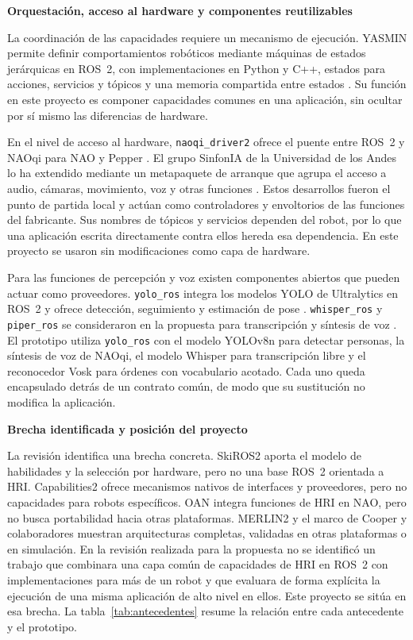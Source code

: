 \documentclass[11pt,letterpaper]{article}
\newcommand{\code}[1]{\nolinkurl{#1}}
\begin{document}
\par\medskip\noindent\textbf{Orquestación, acceso al hardware y componentes reutilizables}\par

La coordinación de las capacidades requiere un mecanismo de ejecución. YASMIN permite definir comportamientos robóticos mediante máquinas de estados jerárquicas en ROS~2, con implementaciones en Python y C++, estados para acciones, servicios y tópicos y una memoria compartida entre estados \cite{yasmin,yasminrepo}. Su función en este proyecto es componer capacidades comunes en una aplicación, sin ocultar por sí mismo las diferencias de hardware.

En el nivel de acceso al hardware, \code{naoqi_driver2} ofrece el puente entre ROS~2 y NAOqi para NAO y Pepper \cite{naoqidriver}. El grupo SinfonIA de la Universidad de los Andes lo ha extendido mediante un metapaquete de arranque que agrupa el acceso a audio, cámaras, movimiento, voz y otras funciones \cite{sinfonia}. Estos desarrollos fueron el punto de partida local y actúan como controladores y envoltorios de las funciones del fabricante. Sus nombres de tópicos y servicios dependen del robot, por lo que una aplicación escrita directamente contra ellos hereda esa dependencia. En este proyecto se usaron sin modificaciones como capa de hardware.

Para las funciones de percepción y voz existen componentes abiertos que pueden actuar como proveedores. \code{yolo_ros} integra los modelos YOLO de Ultralytics en ROS~2 y ofrece detección, seguimiento y estimación de pose \cite{yoloros,ultralytics}. \code{whisper_ros} y \code{piper_ros} se consideraron en la propuesta para transcripción y síntesis de voz \cite{whisperros,piperros}. El prototipo utiliza \code{yolo_ros} con el modelo YOLOv8n para detectar personas, la síntesis de voz de NAOqi, el modelo Whisper \cite{whisper} para transcripción libre y el reconocedor Vosk \cite{vosk} para órdenes con vocabulario acotado. Cada uno queda encapsulado detrás de un contrato común, de modo que su sustitución no modifica la aplicación.

\par\medskip\noindent\textbf{Brecha identificada y posición del proyecto}\par

La revisión identifica una brecha concreta. SkiROS2 aporta el modelo de habilidades y la selección por hardware, pero no una base ROS~2 orientada a HRI. Capabilities2 ofrece mecanismos nativos de interfaces y proveedores, pero no capacidades para robots específicos. OAN integra funciones de HRI en NAO, pero no busca portabilidad hacia otras plataformas. MERLIN2 y el marco de Cooper y colaboradores muestran arquitecturas completas, validadas en otras plataformas o en simulación. En la revisión realizada para la propuesta no se identificó un trabajo que combinara una capa común de capacidades de HRI en ROS~2 con implementaciones para más de un robot y que evaluara de forma explícita la ejecución de una misma aplicación de alto nivel en ellos. Este proyecto se sitúa en esa brecha. La tabla~\ref{tab:antecedentes} resume la relación entre cada antecedente y el prototipo.
\end{document}
